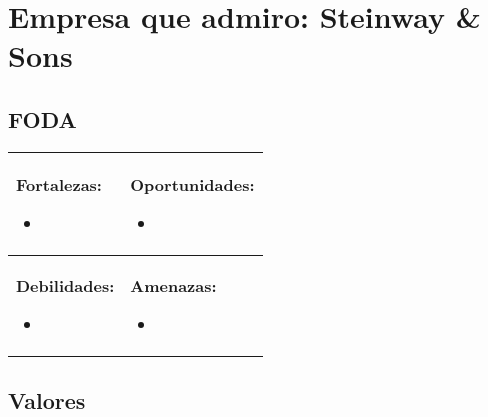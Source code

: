 \documentclass{article}
\begin{document}
\maketitle


\section{Empresa que admiro: Steinway \& Sons}



\subsection{FODA}
\begin{center}
   \begin{tabular}{ | p{8.5cm} | p{8.5cm} | }
        \hline
            \textbf{Fortalezas: } 
            \begin{itemize}
                \item 
            \end{itemize}
            &
            \textbf{Oportunidades: } 
            \begin{itemize}
                \item 
            \end{itemize}
            \\ 
        \hline
            \textbf{Debilidades: } 
            \begin{itemize}
                \item 
            \end{itemize}
            &
            \textbf{Amenazas: } 
            \begin{itemize}
                \item 
            \end{itemize}
            \\ 
        \hline
   \end{tabular}
\end{center}



\subsection{Valores}
\end{document}
